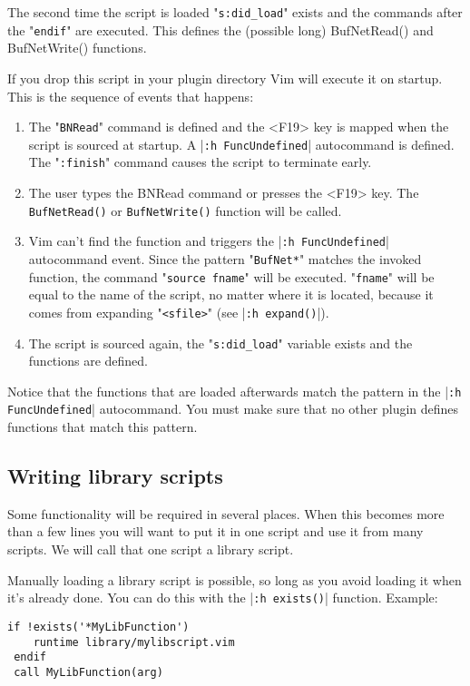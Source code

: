 The second time the script is loaded "\texttt{s:did\_load}" exists and the commands after the "\texttt{endif}" are executed.
This defines the (possible long) BufNetRead() and BufNetWrite() functions.

If you drop this script in your plugin directory Vim will execute it on startup.
This is the sequence of events that happens:

\begin{enumerate}
				\item The "\texttt{BNRead}" command is defined and the <F19> key is mapped when the script is sourced at startup.
								A |\texttt{:h FuncUndefined}| autocommand is defined.
								The "\texttt{:finish}" command causes the script to terminate early.
				\item The user types the BNRead command or presses the <F19> key.
								The \texttt{BufNetRead()} or \texttt{BufNetWrite()} function will be called.
				\item Vim can't find the function and triggers the |\texttt{:h FuncUndefined}| autocommand event.
								Since the pattern "\texttt{BufNet*}" matches the invoked function, the command "\texttt{source fname}" will be executed.
								"\texttt{fname}" will be equal to the name of the script, no matter where it is located, because it comes from expanding "\texttt{<sfile>}" (see |\texttt{:h expand()}|).
				\item The script is sourced again, the "\texttt{s:did\_load}" variable exists and the functions are defined.
\end{enumerate}

Notice that the functions that are loaded afterwards match the pattern in the |\texttt{:h FuncUndefined}| autocommand.
You must make sure that no other plugin defines functions that match this pattern.
\subsection{Writing library scripts}
\label{Writing library scripts}
\label{write-library-script}
Some functionality will be required in several places.
When this becomes more than a few lines you will want to put it in one script and use it from many scripts.
We will call that one script a library script.

Manually loading a library script is possible, so long as you avoid loading it when it's already done.
You can do this with the |\texttt{:h exists()}| function.
Example:

\begin{Verbatim}[samepage=true]
 if !exists('*MyLibFunction')
    runtime library/mylibscript.vim
 endif
 call MyLibFunction(arg)
\end{Verbatim}

